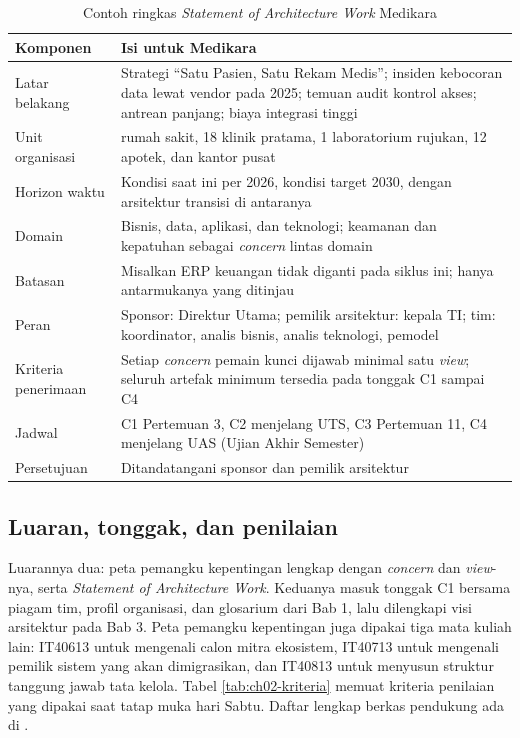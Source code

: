 \begin{table}[!htb]
  \centering
  \caption{Contoh ringkas \textit{Statement of Architecture Work} Medikara}
  \label{tab:ch02-sow-medikara}
  {\footnotesize
  \begin{tabularx}{\textwidth}{>{\raggedright\arraybackslash}p{2.6cm}
                               >{\raggedright\arraybackslash}X}
    \hline
    \textbf{Komponen} & \textbf{Isi untuk Medikara} \\
    \hline
    Latar belakang & Strategi ``Satu Pasien, Satu Rekam Medis''; insiden kebocoran data lewat vendor pada 2025; temuan audit kontrol akses; antrean panjang; biaya integrasi tinggi \\
    \hline
    Unit organisasi & 5 rumah sakit, 18 klinik pratama, 1 laboratorium rujukan, 12 apotek, dan kantor pusat \\
    \hline
    Horizon waktu & Kondisi saat ini per 2026, kondisi target 2030, dengan arsitektur transisi di antaranya \\
    \hline
    Domain & Bisnis, data, aplikasi, dan teknologi; keamanan dan kepatuhan sebagai \textit{concern} lintas domain \\
    \hline
    Batasan & Misalkan ERP keuangan tidak diganti pada siklus ini; hanya antarmukanya yang ditinjau \\
    \hline
    Peran & Sponsor: Direktur Utama; pemilik arsitektur: kepala TI; tim: koordinator, analis bisnis, analis teknologi, pemodel \\
    \hline
    Kriteria penerimaan & Setiap \textit{concern} pemain kunci dijawab minimal satu \textit{view}; seluruh artefak minimum tersedia pada tonggak C1 sampai C4 \\
    \hline
    Jadwal & C1 Pertemuan 3, C2 menjelang UTS, C3 Pertemuan 11, C4 menjelang UAS (Ujian Akhir Semester) \\
    \hline
    Persetujuan & Ditandatangani sponsor dan pemilik arsitektur \\
    \hline
  \end{tabularx}}
\end{table}

\subsection*{Luaran, tonggak, dan penilaian}

Luarannya dua: peta pemangku kepentingan lengkap dengan \textit{concern} dan
\textit{view}-nya, serta \textit{Statement of Architecture Work}. Keduanya
masuk tonggak C1 bersama piagam tim, profil organisasi, dan glosarium dari
Bab 1, lalu dilengkapi visi arsitektur pada Bab 3. Peta pemangku kepentingan
juga dipakai tiga mata kuliah lain: IT40613 untuk mengenali calon mitra
ekosistem, IT40713 untuk mengenali pemilik sistem yang akan dimigrasikan, dan
IT40813 untuk menyusun struktur tanggung jawab tata kelola. Tabel
\ref{tab:ch02-kriteria} memuat kriteria penilaian yang dipakai saat tatap
muka hari Sabtu. Daftar lengkap berkas pendukung ada di
.

